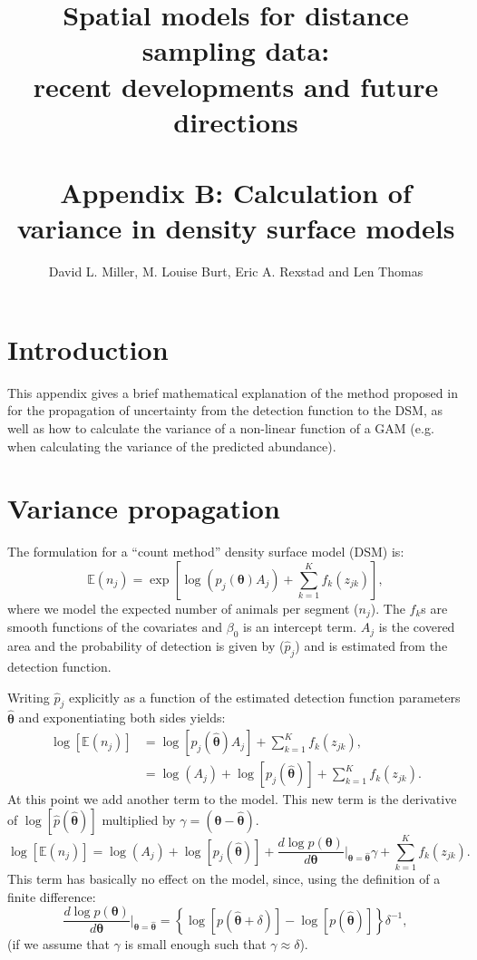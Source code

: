 \documentclass[11pt]{amsart}
\title{{\Small Spatial models for distance sampling data:\\ recent developments and future directions}\\ \mbox{} \\ Appendix B: Calculation of variance in density surface models}
\author{David L. Miller, M. Louise Burt, Eric A. Rexstad and Len Thomas}
\begin{document}
\maketitle


\section{Introduction}

This appendix gives a brief mathematical explanation of the method proposed in \cite{WILLIAMS:2011in} for the propagation of uncertainty from the detection function to the DSM, as well as how to calculate the variance of a non-linear function of a GAM (e.g. when calculating the variance of the predicted abundance).

\section{Variance propagation}

The formulation for a ``count method'' density surface model (DSM) is:
\begin{equation*}
\mathbb{E}(n_j) = \exp\left[ \log\left(p_j(\bm{\theta})A_j\right) + \sum_{k=1}^K f_k(z_{jk}) \right],
\end{equation*}
where we model the expected number of animals per segment ($n_j$). The $f_k$s are smooth functions of the covariates and $\beta_0$ is an intercept term. $A_j$ is the covered area and the probability of detection is given by ($\hat{p}_j$) and is estimated from the detection function.

Writing $\hat{p}_j$ explicitly as a function of the estimated detection function parameters $\bm{\hat{\theta}}$ and exponentiating both sides yields:
\begin{align*}
\log\left[ \mathbb{E}(n_j) \right] &= \log\left[p_j(\bm{\hat{\theta}})A_j\right] + \sum_{k=1}^K f_k(z_{jk}), \\
&= \log\left(A_j\right) + \log\left[p_j(\bm{\hat{\theta}})\right] + \sum_{k=1}^K f_k(z_{jk}).
\end{align*}
At this point we add another term to the model. This new term is the derivative of $\log\left[ \hat{p}(\bm{\hat{\theta}})\right]$ multiplied by $\gamma =(\bm{\theta} - \bm{\hat{\theta}})$.
\begin{equation}
\log\left[ \mathbb{E}(n_j) \right] = \log\left(A_j\right) + \log\left[p_j(\bm{\hat{\theta}})\right] + \frac{ d \log p(\bm{\theta})}{d\bm{\theta}} \Big\vert_{\bm{\theta} = \hat{\bm{\theta}}} \gamma + \sum_{k=1}^K f_k(z_{jk}).
\label{extra-term}
\end{equation}
This term has basically no effect on the model, since, using the definition of a finite difference:
\begin{equation*}
\frac{ d \log p(\bm{\theta})}{d\bm{\theta}} \Big\vert_{\bm{\theta} = \hat{\bm{\theta}}} = \left\{\log\left[p(\hat{\bm{\theta}} + \delta)\right] - \log\left[p(\hat{\bm{\theta}})\right]\right\}\delta^{-1},
\end{equation*}
(if we assume that $\gamma$ is small enough such that $\gamma \approx \delta$).
\end{document}
